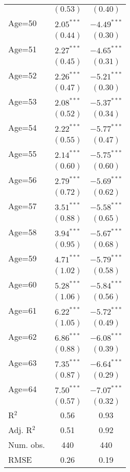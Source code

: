 \documentclass[fullpage]{paper}
\begin{document}
\begin{center}
\begin{longtable}{l c c }
            & $(0.53)$      & $(0.40)$      \\
Age=50      & $2.05^{***}$  & $-4.49^{***}$ \\
            & $(0.44)$      & $(0.30)$      \\
Age=51      & $2.27^{***}$  & $-4.65^{***}$ \\
            & $(0.45)$      & $(0.31)$      \\
Age=52      & $2.26^{***}$  & $-5.21^{***}$ \\
            & $(0.47)$      & $(0.30)$      \\
Age=53      & $2.08^{***}$  & $-5.37^{***}$ \\
            & $(0.52)$      & $(0.34)$      \\
Age=54      & $2.22^{***}$  & $-5.77^{***}$ \\
            & $(0.55)$      & $(0.47)$      \\
Age=55      & $2.14^{***}$  & $-5.75^{***}$ \\
            & $(0.60)$      & $(0.60)$      \\
Age=56      & $2.79^{***}$  & $-5.69^{***}$ \\
            & $(0.72)$      & $(0.62)$      \\
Age=57      & $3.51^{***}$  & $-5.58^{***}$ \\
            & $(0.88)$      & $(0.65)$      \\
Age=58      & $3.94^{***}$  & $-5.67^{***}$ \\
            & $(0.95)$      & $(0.68)$      \\
Age=59      & $4.71^{***}$  & $-5.79^{***}$ \\
            & $(1.02)$      & $(0.58)$      \\
Age=60      & $5.28^{***}$  & $-5.84^{***}$ \\
            & $(1.06)$      & $(0.56)$      \\
Age=61      & $6.22^{***}$  & $-5.72^{***}$ \\
            & $(1.05)$      & $(0.49)$      \\
Age=62      & $6.86^{***}$  & $-6.08^{***}$ \\
            & $(0.88)$      & $(0.39)$      \\
Age=63      & $7.35^{***}$  & $-6.64^{***}$ \\
            & $(0.87)$      & $(0.29)$      \\
Age=64      & $7.50^{***}$  & $-7.07^{***}$ \\
            & $(0.57)$      & $(0.32)$      \\
\hline
R$^2$       & 0.56          & 0.93          \\
Adj. R$^2$  & 0.51          & 0.92          \\
Num. obs.   & 440           & 440           \\
RMSE        & 0.26          & 0.19          \\
\end{longtable}
\end{center}
\end{document}
